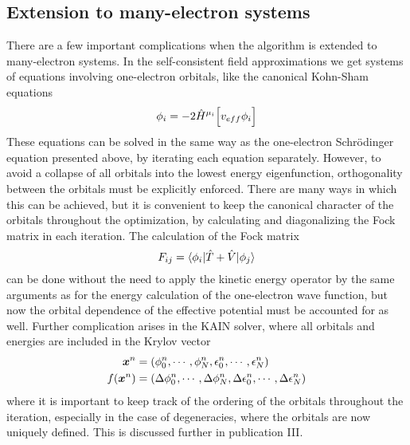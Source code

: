 \subsection{Extension to many-electron systems}
There are a few important complications when the algorithm is extended to many-electron systems.
In the self-consistent field approximations we get systems of equations involving one-electron 
orbitals, like the canonical Kohn-Sham equations
\begin{equation}
    \phi_i = -2 \hat{H}^{\mu_i}\Big[v_{eff}\phi_i\Big]
\end{equation}
These equations can be solved in the same way as the one-electron Schr\"{o}dinger equation presented 
above, by iterating each equation separately. However, to avoid a collapse of all orbitals into the
lowest energy eigenfunction, orthogonality between the orbitals must be explicitly 
enforced\cite{Harrison_basic:2004}. There 
are many ways in which this can be achieved, but it is convenient to keep the canonical character of 
the orbitals throughout the optimization, by calculating and diagonalizing the Fock matrix in each 
iteration. The calculation of the Fock matrix 
\begin{equation}
    F_{ij} = \langle\phi_i|\hat{T}+\hat{V}|\phi_j\rangle
\end{equation}
can be done without the need to apply the kinetic energy operator by the same arguments as for 
the energy calculation of the one-electron wave function, but now the orbital dependence of the 
effective potential must be accounted for as well. Further complication arises in the KAIN solver, 
where all orbitals and energies are included in the Krylov vector
\begin{align}
    \boldsymbol x^n &= \left(\phi_0^n,\cdots,\phi_N^n,\epsilon_0^n,\cdots,\epsilon_N^n\right)\\
    f(\boldsymbol x^n) &= \left(\Delta\phi_0^n,\cdots,\Delta\phi_N^n,
	\Delta\epsilon_0^n,\cdots,\Delta\epsilon_N^n\right)
\end{align}
where it is important to keep track of the ordering of the orbitals throughout the iteration, 
especially in the case of degeneracies, where the orbitals are now uniquely defined. This is 
discussed further in publication III.


